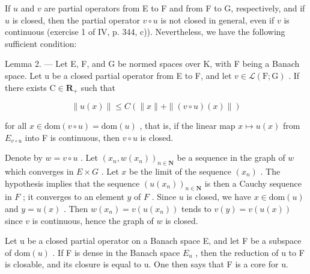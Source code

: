 If \(u\) and \(v\) are partial operators from E to F and from F to G, respectively, and if \(u\) is closed, then the partial operator \(v \circ u\) is not closed in general, even if \(v\) is continuous (exercise 1 of IV, p. 344, c)). Nevertheless, we have the following sufficient condition:

Lemma 2. --- Let E, F, and G be normed spaces over K, with F being a Banach space. Let u be a closed partial operator from E to F, and let \(v \in \mathcal{L}(\mathrm{F};\mathrm{G})\) . If there exists \(\mathrm{C} \in \mathbf{R}_{+}\) such that

\[
\| u (x) \| \leqslant C (\| x \| + \| (v \circ u) (x) \|)
\]

for all \(x \in \text{dom}(v \circ u) = \text{dom}(u)\) , that is, if the linear map \(x \mapsto u(x)\) from \(E_{v \circ u}\) into F is continuous, then \(v \circ u\) is closed.

Denote by \(w = v \circ u\) . Let \((x_n, w(x_n))_{n \in \mathbf{N}}\) be a sequence in the graph of \(w\) which converges in \(E \times G\) . Let \(x\) be the limit of the sequence \((x_n)\) . The hypothesis implies that the sequence \((u(x_n))_{n \in \mathbf{N}}\) is then a Cauchy sequence in \(F\) ; it converges to an element \(y\) of \(F\) . Since \(u\) is closed, we have \(x \in \text{dom}(u)\) and \(y = u(x)\) . Then \(w(x_n) = v(u(x_n))\) tends to \(v(y) = v(u(x))\) since \(v\) is continuous, hence the graph of \(w\) is closed.

Let u be a closed partial operator on a Banach space E, and let F be a subspace of \(\text{dom}(u)\) . If F is dense in the Banach space \(E_{u}\) , then the reduction of u to F is closable, and its closure is equal to u. One then says that F is a core for u.


